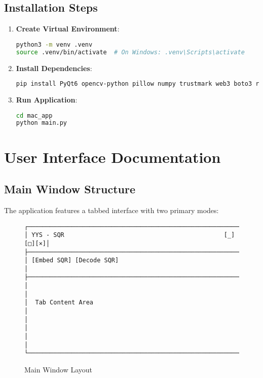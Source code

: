 \documentclass[12pt,a4paper]{article}
\begin{document}
\subsection{Installation Steps}

\begin{enumerate}
    \item \textbf{Create Virtual Environment}:
    \begin{lstlisting}[language=bash]
python3 -m venv .venv
source .venv/bin/activate  # On Windows: .venv\Scripts\activate
    \end{lstlisting}

    \item \textbf{Install Dependencies}:
    \begin{lstlisting}[language=bash]
pip install PyQt6 opencv-python pillow numpy trustmark web3 boto3 requests
    \end{lstlisting}

    \item \textbf{Run Application}:
    \begin{lstlisting}[language=bash]
cd mac_app
python main.py
    \end{lstlisting}
\end{enumerate}

\section{User Interface Documentation}

\subsection{Main Window Structure}

The application features a tabbed interface with two primary modes:

\begin{figure}[H]
\centering
\begin{verbatim}
┌─────────────────────────────────────────────────────────────┐
│ YYS - SQR                                            [_][□][×]│
├─────────────────────────────────────────────────────────────┤
│ [Embed SQR] [Decode SQR]                                    │
├─────────────────────────────────────────────────────────────┤
│                                                             │
│  Tab Content Area                                           │
│                                                             │
│                                                             │
└─────────────────────────────────────────────────────────────┘
\end{verbatim}
\caption{Main Window Layout}
\end{figure}
\end{document}
